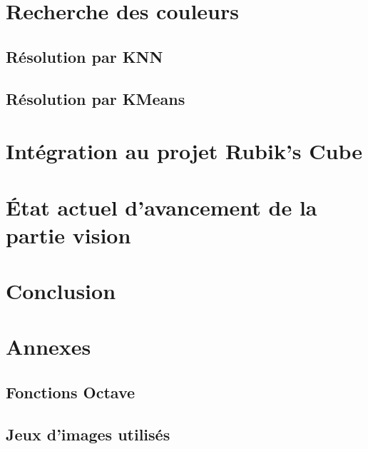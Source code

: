 \documentclass[a4paper,10pt]{article}
\newcommand{\rubic}{Rubik's Cube}
\begin{document}
\section{Recherche des couleurs} %


\subsection{Résolution par KNN}


\subsection{Résolution par KMeans}



\section{Intégration au projet \rubic} %


\section{État actuel d'avancement de la partie vision} %
\label{sec:avancement}


\section{Conclusion} %


\section{Annexes}

\subsection{Fonctions Octave}


\subsection{Jeux d'images utilisés}
\label{sec:Aconf}

\end{document}

